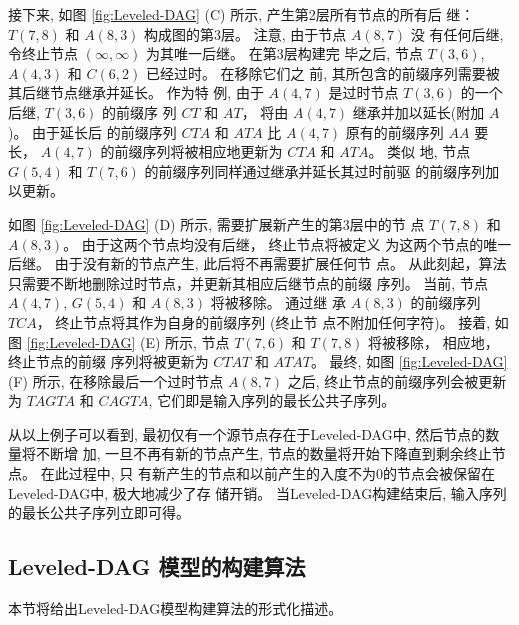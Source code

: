 接下来, 如图 \ref{fig:Leveled-DAG} (C) 所示, 产生第2层所有节点的所有后
继：$T(7, 8)$ 和 $A(8, 3)$ 构成图的第3层。 注意, 由于节点 $A(8, 7)$ 没
有任何后继, 令终止节点 $(\infty, \infty)$ 为其唯一后继。 在第3层构建完
毕之后, 节点 $T(3, 6)$, $A(4, 3)$ 和 $C(6, 2)$ 已经过时。 在移除它们之
前, 其所包含的前缀序列需要被其后继节点继承并延长。 作为特
例, 由于 $A(4, 7)$ 是过时节点 $T(3, 6)$ 的一个后继, $T(3, 6)$ 的前缀序
列 $CT$ 和 $AT$， 将由 $A(4, 7)$ 继承并加以延长(附加 $A$)。 由于延长后
的前缀序列 $CTA$ 和 $ATA$ 比 $A(4, 7)$ 原有的前缀序列 $AA$ 要
长， $A(4, 7)$ 的前缀序列将被相应地更新为 $CTA$ 和 $ATA$。 类似
地, 节点 $G(5, 4)$ 和 $T(7, 6)$ 的前缀序列同样通过继承并延长其过时前驱
的前缀序列加以更新。

如图 \ref{fig:Leveled-DAG} (D) 所示, 需要扩展新产生的第3层中的节
点 $T(7, 8)$ 和 $A(8, 3)$。 由于这两个节点均没有后继， 终止节点将被定义
为这两个节点的唯一后继。 由于没有新的节点产生, 此后将不再需要扩展任何节
点。 从此刻起，算法只需要不断地删除过时节点，并更新其相应后继节点的前缀
序列。 当前, 节点 $A(4, 7)$, $G(5, 4)$ 和 $A(8, 3)$ 将被移除。 通过继
承 $A(8, 3)$ 的前缀序列 $TCA$， 终止节点将其作为自身的前缀序列 (终止节
点不附加任何字符)。 接着, 如图 \ref{fig:Leveled-DAG}
(E) 所示, 节点 $T(7, 6)$ 和 $T(7, 8)$ 将被移除， 相应地，终止节点的前缀
序列将被更新为 $CTAT$ 和 $ATAT$。 最终, 如图 \ref{fig:Leveled-DAG} (F)
所示, 在移除最后一个过时节点 $A(8, 7)$ 之后, 终止节点的前缀序列会被更新
为 $TAGTA$ 和 $CAGTA$, 它们即是输入序列的最长公共子序列。

从以上例子可以看到, 最初仅有一个源节点存在于Leveled-DAG中, 然后节点的数量将不断增
加, 一旦不再有新的节点产生, 节点的数量将开始下降直到剩余终止节点。 在此过程中, 只
有新产生的节点和以前产生的入度不为0的节点会被保留在Leveled-DAG中, 极大地减少了存
储开销。 当Leveled-DAG构建结束后, 输入序列的最长公共子序列立即可得。

\subsection{Leveled-DAG 模型的构建算法 }
\label{sec:PMA}

本节将给出Leveled-DAG模型构建算法的形式化描述。

